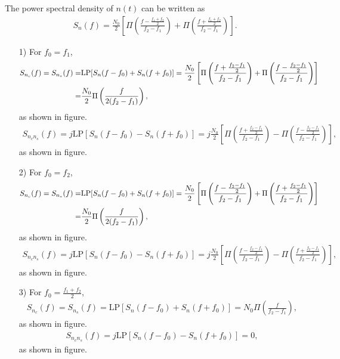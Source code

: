 \documentclass{assignment}
\begin{document}
\begin{sol}
    The power spectral density of $n(t)$ can be written as
    \begin{align}
        S_n(f)=\frac{N_0}{2}\left[\Pi\left(\frac{f-\frac{f_1+f_2}{2}}{f_2-f_1}\right)+\Pi\left(\frac{f+\frac{f_1+f_2}{2}}{f_2-f_1}\right)\right].
    \end{align}
    \begin{itemize}
        \item[1)] For $f_0=f_1$,
        \begin{align}
            \notag S_{n_c}(f)=S_{n_s}(f)=&\text{LP}[S_n(f-f_0)+S_n(f+f_0)]=\frac{N_0}{2}\left[\Pi\left(\frac{f+\frac{f_2-f_1}{2}}{f_2-f_1}\right)+\Pi\left(\frac{f-\frac{f_2-f_1}{2}}{f_2-f_1}\right)\right]\\
            =&\frac{N_0}{2}\Pi\left(\frac{f}{2(f_2-f_1)}\right),
        \end{align}
        as shown in figure.
        \begin{align}
            S_{n_cn_s}(f)=j\text{LP}[S_n(f-f_0)-S_n(f+f_0)]=j\frac{N_0}{2}\left[\Pi\left(\frac{f+\frac{f_2-f_1}{2}}{f_2-f_1}\right)-\Pi\left(\frac{f-\frac{f_2-f_1}{2}}{f_2-f_1}\right)\right],
        \end{align}
        as shown in figure.
        \item[2)] For $f_0=f_2$,
        \begin{align}
            \notag S_{n_c}(f)=S_{n_s}(f)=&\text{LP}[S_n(f-f_0)+S_n(f+f_0)]=\frac{N_0}{2}\left[\Pi\left(\frac{f-\frac{f_2-f_1}{2}}{f_2-f_1}\right)+\Pi\left(\frac{f+\frac{f_2-f_1}{2}}{f_2-f_1}\right)\right]\\
            =&\frac{N_0}{2}\Pi\left(\frac{f}{2(f_2-f_1)}\right),
        \end{align}
        as shown in figure.
        \begin{align}
            S_{n_cn_s}(f)=j\text{LP}[S_n(f-f_0)-S_n(f+f_0)]=j\frac{N_0}{2}\left[\Pi\left(\frac{f-\frac{f_2-f_1}{2}}{f_2-f_1}\right)-\Pi\left(\frac{f+\frac{f_2-f_1}{2}}{f_2-f_1}\right)\right],
        \end{align}
        as shown in figure.
        \item[3)] For $f_0=\frac{f_1+f_2}{2}$,
        \begin{align}
            S_{n_c}(f)=S_{n_s}(f)=\text{LP}\left[S_n(f-f_0)+S_n(f+f_0)\right]=N_0\Pi\left(\frac{f}{f_2-f_1}\right),
        \end{align}
        as shown in figure.
        \begin{align}
            S_{n_cn_s}(f)=j\text{LP}[S_n(f-f_0)-S_n(f+f_0)]=0,
        \end{align}
        as shown in figure.
        

\end{itemize}
\end{sol}
\end{document}

